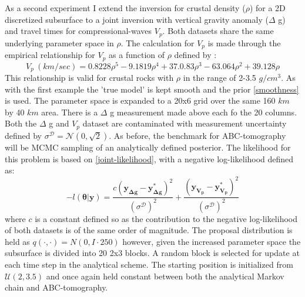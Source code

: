 As a second experiment I extend the inversion for crustal density ($\rho$) for a 2D discretized subsurface to a joint inversion with vertical gravity anomaly ($\Delta$ g) and travel times for compressional-waves $V_p$. Both datasets share the same underlying parameter space in $\rho$. The calculation for $V_p$ is made through the empirical relationship for $V_p$ as a function of $\rho$ defined by \citet{Brocher2005}:
\begin{equation}
	V_p\ (km/sec) = 0.8228\rho^5 - 9.1819\rho^4 + 37.0.83\rho^3 - 63.064\rho^2 + 39.128\rho
\end{equation}
This relationship is valid for crustal rocks with $\rho$ in the range of 2-3.5 $g/cm^3$. As with the first example the 'true model' is kept smooth and the prior \ref{smoothness} is used. The parameter space is expanded to a 20x6 grid over the same 160 $km$ by 40 $km$ area. There is a $\Delta$ g measurement made above each fo the 20 columns. Both the $\Delta$ g and $V_p$ dataset are contaminated with measurement uncertainty defined by $\sigma^{\mathcal{D}} = \mathcal{N}(0,\sqrt{2})$. As before, the benchmark for ABC-tomography will be MCMC sampling of an analytically defined posterior. The likelihood for this problem is based on \ref{joint-likelihood}, with a negative log-likelihood defined as:
\begin{equation}
	-l(\bm{\theta}|\bm{y}) = \frac{c(\bm{y_{\Delta g}}-\bm{y^*_{\Delta g}})^2}{(\sigma^{\mathcal{D}})^2} + \frac{(\bm{y_{V_p}}-\bm{y^*_{V_p}})^2}{(\sigma^{\mathcal{D}})^2}
\end{equation}
where $c$ is a constant defined so as the contribution to the negative log-likelihood of both datasets is of the same order of magnitude. The proposal distribution is held as $q(\cdot,\cdot) = N(0,I\cdot250)$ however, given the increased parameter space the subsurface is divided into 20 2x3 blocks. A random block is selected for update at each time step in the analytical scheme. The starting position is initialized from $\mathcal{U}(2,3.5)$  and once again held constant between both the analytical Markov chain and ABC-tomography. \par

